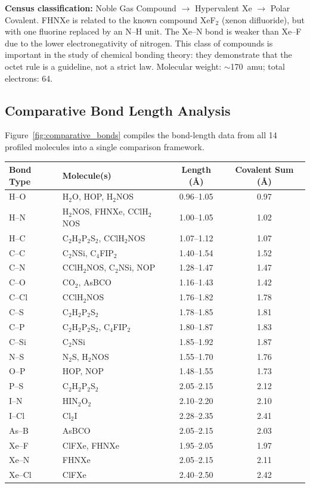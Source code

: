 \documentclass[11pt,a4paper]{article}
\begin{document}
\noindent\textbf{Census classification:}  Noble Gas Compound $\to$
Hypervalent Xe $\to$ Polar Covalent.  FHNXe is related to the known
compound XeF$_2$ (xenon difluoride), but with one fluorine replaced by
an N--H unit.  The Xe--N bond is weaker than Xe--F due to the lower
electronegativity of nitrogen.  This class of compounds is important in
the study of chemical bonding theory: they demonstrate that the octet
rule is a guideline, not a strict law.  Molecular weight: $\sim$170~amu;
total electrons: 64.

\subsection{Comparative Bond Length Analysis}

Figure~\ref{fig:comparative_bonds} compiles the bond-length data from
all 14 profiled molecules into a single comparison framework.

\begin{center}
\begin{tabular}{llcc}
\toprule
\textbf{Bond Type} & \textbf{Molecule(s)} & \textbf{Length (\AA)} & \textbf{Covalent Sum (\AA)} \\
\midrule
H--O  & H$_2$O, HOP, H$_2$NOS          & 0.96--1.05 & 0.97 \\
H--N  & H$_2$NOS, FHNXe, CClH$_2$NOS   & 1.00--1.05 & 1.02 \\
H--C  & C$_2$H$_2$P$_2$S$_2$, CClH$_2$NOS & 1.07--1.12 & 1.07 \\
C--C  & C$_2$NSi, C$_4$FIP$_2$          & 1.40--1.54 & 1.52 \\
C--N  & CClH$_2$NOS, C$_2$NSi, NOP      & 1.28--1.47 & 1.47 \\
C--O  & CO$_2$, AsBCO                   & 1.16--1.43 & 1.42 \\
C--Cl & CClH$_2$NOS                     & 1.76--1.82 & 1.78 \\
C--S  & C$_2$H$_2$P$_2$S$_2$           & 1.78--1.85 & 1.81 \\
C--P  & C$_2$H$_2$P$_2$S$_2$, C$_4$FIP$_2$ & 1.80--1.87 & 1.83 \\
C--Si & C$_2$NSi                        & 1.85--1.92 & 1.87 \\
N--S  & N$_2$S, H$_2$NOS               & 1.55--1.70 & 1.76 \\
O--P  & HOP, NOP                        & 1.48--1.55 & 1.73 \\
P--S  & C$_2$H$_2$P$_2$S$_2$           & 2.05--2.15 & 2.12 \\
I--N  & HIN$_2$O$_2$                    & 2.10--2.20 & 2.10 \\
I--Cl & Cl$_2$I                         & 2.28--2.35 & 2.41 \\
As--B & AsBCO                           & 2.05--2.15 & 2.03 \\
Xe--F & ClFXe, FHNXe                    & 1.95--2.05 & 1.97 \\
Xe--N & FHNXe                           & 2.05--2.15 & 2.11 \\
Xe--Cl & ClFXe                          & 2.40--2.50 & 2.42 \\
\bottomrule
\end{tabular}
\end{center}
\end{document}
